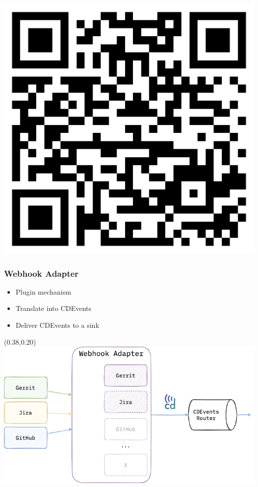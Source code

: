 \documentclass[aspectratio=169,11pt,hyperref={colorlinks=true}]{beamer}
\begin{document}
\begin{tpicstripedframe}
{\begin{textblock*}{0.17\paperwidth}
    \includegraphics[width=0.17\paperwidth]{img/cdevents-v4-release-announcement.png}
  \end{textblock*}
  }%
\end{tpicstripedframe}

\begin{grayframe}
  \frametitle{Webhook Adapter}
  \begin{itemize}
    \item Plugin mechanism
    \item Translate into CDEvents
    \item Deliver CDEvents to a sink
  \end{itemize}
  \begin{textblock*}{0.60\paperwidth}(0.38\paperwidth,0.20\paperheight)
    \includegraphics[width=0.60\paperwidth]{img/cdevents-webhook_adapter.png}
  \end{textblock*}
\end{grayframe}
\end{document}
